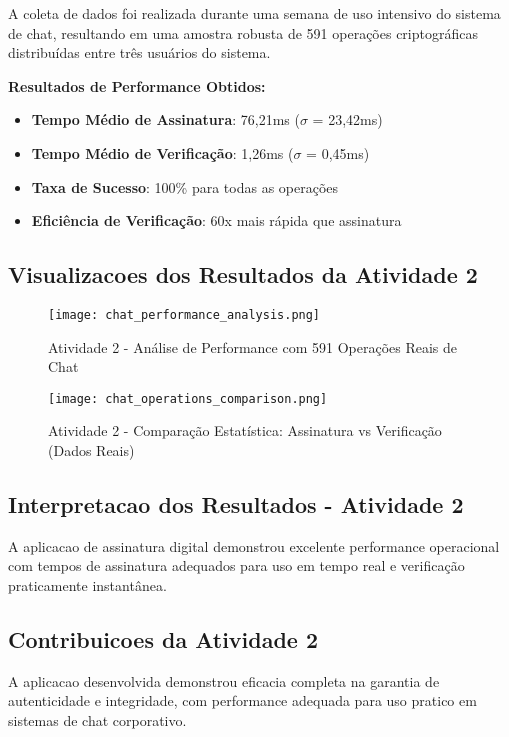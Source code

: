 \documentclass[12pt,a4paper,oneside]{article}
\begin{document}
A coleta de dados foi realizada durante uma semana de uso intensivo do sistema de chat, resultando em uma amostra robusta de 591 operações criptográficas distribuídas entre três usuários do sistema.

\textbf{Resultados de Performance Obtidos:}
\begin{itemize}
    \item \textbf{Tempo Médio de Assinatura}: 76,21ms ($\sigma$ = 23,42ms)
    \item \textbf{Tempo Médio de Verificação}: 1,26ms ($\sigma$ = 0,45ms)
    \item \textbf{Taxa de Sucesso}: 100\% para todas as operações
    \item \textbf{Eficiência de Verificação}: 60x mais rápida que assinatura
\end{itemize}

\subsection{Visualizacoes dos Resultados da Atividade 2}

\begin{figure}[H]
\centering
\texttt{[image: chat\_performance\_analysis.png]}
\caption{Atividade 2 - Análise de Performance com 591 Operações Reais de Chat}
\label{fig:atividade2_performance}
\end{figure}

\begin{figure}[H]
\centering
\texttt{[image: chat\_operations\_comparison.png]}
\caption{Atividade 2 - Comparação Estatística: Assinatura vs Verificação (Dados Reais)}
\label{fig:atividade2_comparison}
\end{figure}

\subsection{Interpretacao dos Resultados - Atividade 2}

A aplicacao de assinatura digital demonstrou excelente performance operacional com tempos de assinatura adequados para uso em tempo real e verificação praticamente instantânea.

\subsection{Contribuicoes da Atividade 2}

A aplicacao desenvolvida demonstrou eficacia completa na garantia de autenticidade e integridade, com performance adequada para uso pratico em sistemas de chat corporativo.
\end{document}
